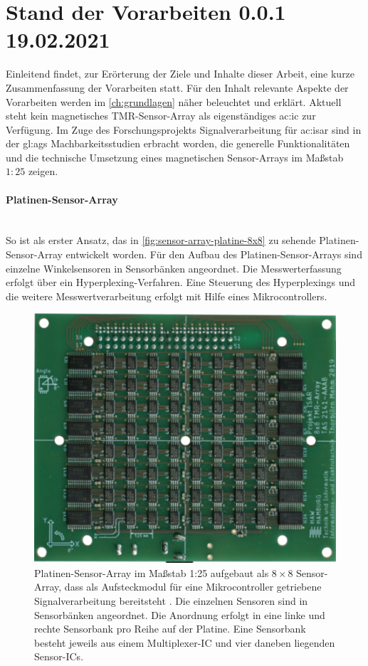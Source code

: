 %

\section{Stand der Vorarbeiten 0.0.1 19.02.2021}\label{sec:stand-der-vorarbeiten}

Einleitend findet, zur Erörterung der Ziele und Inhalte dieser Arbeit, eine kurze Zusammenfassung der Vorarbeiten statt.
Für den Inhalt relevante Aspekte der Vorarbeiten werden im \autoref{ch:grundlagen} näher beleuchtet und erklärt.
\newline
Aktuell steht kein magnetisches TMR-Sensor-Array als eigenständiges \gls{ac:ic} zur Verfügung. Im Zuge des Forschungsprojekts Signalverarbeitung für \gls{ac:isar} sind in der \gls{gl:ags} Machbarkeitsstudien \cite{Mehm2019}\cite{Ernsting2020} erbracht worden, die generelle Funktionalitäten und die technische Umsetzung eines magnetischen Sensor-Arrays im Maßstab $1:25$ zeigen.


\paragraph{Platinen-Sensor-Array}\label{par:platinen-sensor-array}$~$\\


So ist als erster Ansatz, das in \autoref{fig:sensor-array-platine-8x8} zu sehende Platinen-Sensor-Array entwickelt worden. Für den Aufbau des Platinen-Sensor-Arrays sind einzelne Winkelsensoren in Sensorbänken angeordnet. Die Messwerterfassung erfolgt über ein Hyperplexing-Verfahren.
Eine Steuerung des Hyperplexings und die weitere Messwertverarbeitung erfolgt mit Hilfe eines Mikrocontrollers.


\begin{figure}[tbph]
	\centering
	\includegraphics[width=0.5\linewidth]{chapters/images/Sensor-Array-Platine-8x8}
	\caption[Platinen-Sensor-Array im Maßstab 1:25]{Platinen-Sensor-Array im Maßstab 1:25 aufgebaut als $8\times8$ Sensor-Array, dass als Aufsteckmodul für eine Mikrocontroller getriebene Signalverarbeitung bereitsteht \cite{Mehm2019}. Die einzelnen Sensoren sind in Sensorbänken angeordnet. Die Anordnung erfolgt in eine linke und rechte Sensorbank pro Reihe auf der Platine. Eine Sensorbank besteht jeweils aus einem Multiplexer-IC und vier daneben liegenden Sensor-ICs.}
	\label{fig:sensor-array-platine-8x8}
\end{figure}


